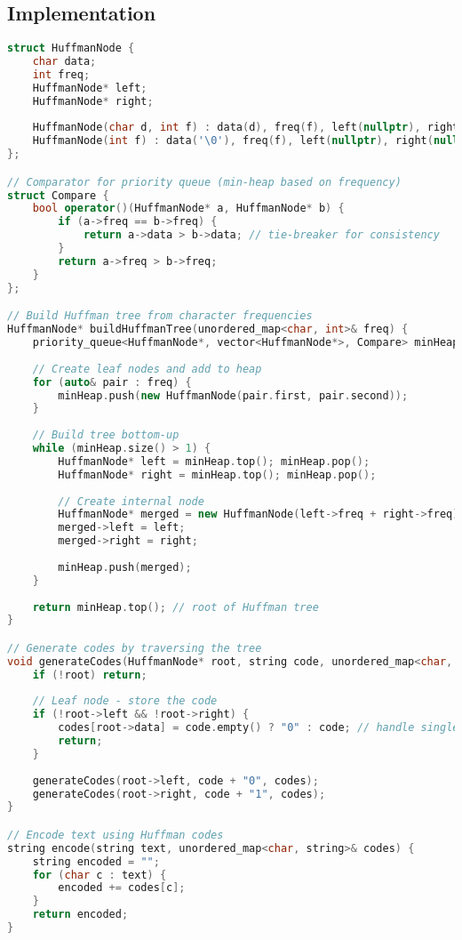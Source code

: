 \documentclass[12pt]{article}
\begin{document}
\subsection{Implementation}

\begin{lstlisting}[language=C++]
struct HuffmanNode {
    char data;
    int freq;
    HuffmanNode* left;
    HuffmanNode* right;
    
    HuffmanNode(char d, int f) : data(d), freq(f), left(nullptr), right(nullptr) {}
    HuffmanNode(int f) : data('\0'), freq(f), left(nullptr), right(nullptr) {}
};

// Comparator for priority queue (min-heap based on frequency)
struct Compare {
    bool operator()(HuffmanNode* a, HuffmanNode* b) {
        if (a->freq == b->freq) {
            return a->data > b->data; // tie-breaker for consistency
        }
        return a->freq > b->freq;
    }
};

// Build Huffman tree from character frequencies
HuffmanNode* buildHuffmanTree(unordered_map<char, int>& freq) {
    priority_queue<HuffmanNode*, vector<HuffmanNode*>, Compare> minHeap;
    
    // Create leaf nodes and add to heap
    for (auto& pair : freq) {
        minHeap.push(new HuffmanNode(pair.first, pair.second));
    }
    
    // Build tree bottom-up
    while (minHeap.size() > 1) {
        HuffmanNode* left = minHeap.top(); minHeap.pop();
        HuffmanNode* right = minHeap.top(); minHeap.pop();
        
        // Create internal node
        HuffmanNode* merged = new HuffmanNode(left->freq + right->freq);
        merged->left = left;
        merged->right = right;
        
        minHeap.push(merged);
    }
    
    return minHeap.top(); // root of Huffman tree
}

// Generate codes by traversing the tree
void generateCodes(HuffmanNode* root, string code, unordered_map<char, string>& codes) {
    if (!root) return;
    
    // Leaf node - store the code
    if (!root->left && !root->right) {
        codes[root->data] = code.empty() ? "0" : code; // handle single character case
        return;
    }
    
    generateCodes(root->left, code + "0", codes);
    generateCodes(root->right, code + "1", codes);
}

// Encode text using Huffman codes
string encode(string text, unordered_map<char, string>& codes) {
    string encoded = "";
    for (char c : text) {
        encoded += codes[c];
    }
    return encoded;
}


\end{lstlisting}
\end{document}
